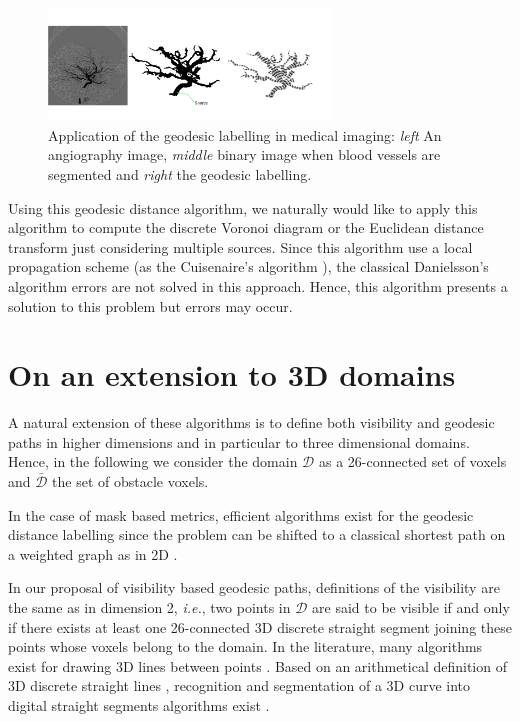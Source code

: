 \documentclass[fleqn,twoside]{article}
\begin{document}
\begin{figure}[htb]
  \begin{center}
    \includegraphics[width=7.5cm]{angio}
    \caption{Application of the geodesic labelling in medical imaging: {\it left} An angiography image,
      {\it middle} binary image when blood vessels are segmented and {\it right} the geodesic
      labelling.}
    \label{angio}
  \end{center}
\end{figure}


Using  this  geodesic distance algorithm,  we naturally  would like to
apply  this algorithm to compute  the discrete Voronoi  diagram or the
Euclidean distance transform just considering multiple sources.  Since
this  algorithm use a  local  propagation scheme (as the  Cuisenaire's
algorithm \cite{cuisenaire}),  the   classical Danielsson's algorithm
errors are not solved in this approach. Hence, this algorithm presents
a solution to this problem but errors may occur.



\section{On an extension to 3D domains}
\label{section3D}
%
%
%

A natural extension of these algorithms is to define both visibility
and geodesic paths in higher dimensions and in particular to three
dimensional domains. Hence, in the following we consider the domain
$\mathcal{D}$ as a 26-connected set of voxels and $\bar{\mathcal{D}}$
the set of obstacle voxels.

In the case of mask based metrics, efficient algorithms exist for the
geodesic distance labelling since the problem can be shifted to a classical
shortest path on a weighted graph as in 2D \cite{kiryati93,sven}. 


In our proposal of visibility based geodesic paths, definitions of the
visibility are the same as in dimension 2, {\it i.e.}, two points in $\mathcal{D}$
 are said  to be visible if  and only if there
exists at least one 26-connected 3D  discrete straight segment joining
these points  whose voxels  belong to the  domain.  In the literature,
many algorithms   exist     for drawing  3D lines   between   points
\cite{bres65,KAU86,AMA87}.  Based on an  arithmetical definition of 3D
discrete straight lines  \cite{FIG95}, recognition and segmentation of
a     3D curve into  digital    straight   segments algorithms   exist
\cite{3Dnss}.
\end{document}
